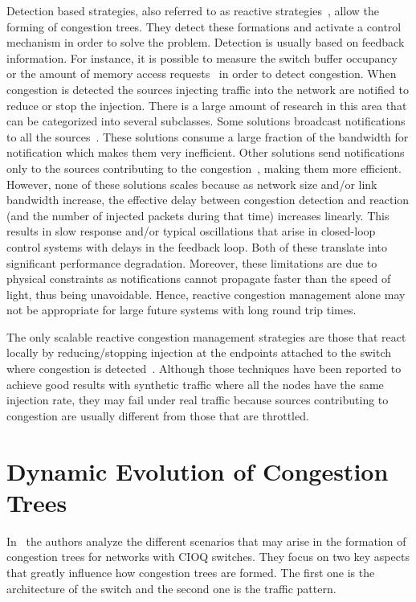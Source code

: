 \documentclass[12pt]{article}
\begin{document}
Detection based strategies, also referred to as reactive strategies~\cite{paper2}, allow the forming of congestion trees. They detect these formations and activate a control mechanism in order to solve the problem.  Detection is usually based on feedback information. For instance, it is possible to measure the switch buffer occupancy~\cite{LSC95,V00} or the amount of memory access requests~\cite{SS90} in order to detect congestion. When congestion is detected the sources injecting traffic into the network are notified to reduce or stop the injection. There is a large amount of research in this area that can be categorized into several subclasses. Some solutions broadcast notifications to all the sources~\cite{TLM01, V00}. These solutions consume a large fraction of the bandwidth for notification which makes them very inefficient. Other solutions send notifications only to the sources contributing to the congestion~\cite{KLC97}, making them more efficient. However, none of these solutions scales because as network size and/or link bandwidth increase, the effective delay between congestion detection and reaction (and the number of injected packets during that time) increases linearly. This results in slow response and/or typical oscillations that arise in closed-loop control systems with delays in the feedback loop. Both of these translate into significant performance degradation. Moreover, these limitations are due to physical constraints as notifications cannot propagate faster than the speed of light, thus being unavoidable. Hence, reactive congestion management alone may not be appropriate for large future systems with long round trip times.

The only scalable reactive congestion management strategies are those that react locally by reducing/stopping injection at the endpoints attached to the switch where congestion is detected~\cite{BLD01, LD93}. Although those techniques have been reported to achieve good results with synthetic traffic where all the nodes have the same injection rate, they may fail under real traffic because sources contributing to congestion are usually different from those that are throttled.

\section{Dynamic Evolution of Congestion Trees}\label{S:evolution}

In~\cite{paper1} the authors analyze the different scenarios that may arise in the formation of congestion trees for networks with CIOQ switches. They focus on two key aspects that greatly influence how congestion trees are formed. The first one is the architecture of the switch and the second one is the traffic pattern. 
\end{document}

